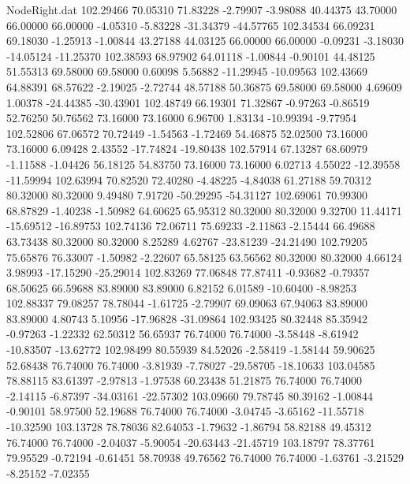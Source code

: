 \begin{filecontents}{NodeRight.dat}
 102.29466   70.05310   71.83228    -2.79907   -3.98088   40.44375   43.70000   66.00000   66.00000   -4.05310   -5.83228  -31.34379  -44.57765
 102.34534   66.09231   69.18030    -1.25913   -1.00844   43.27188   44.03125   66.00000   66.00000   -0.09231   -3.18030  -14.05124  -11.25370
 102.38593   68.97902   64.01118    -1.00844   -0.90101   44.48125   51.55313   69.58000   69.58000    0.60098    5.56882  -11.29945  -10.09563
 102.43669   64.88391   68.57622    -2.19025   -2.72744   48.57188   50.36875   69.58000   69.58000    4.69609    1.00378  -24.44385  -30.43901
 102.48749   66.19301   71.32867    -0.97263   -0.86519   52.76250   50.76562   73.16000   73.16000    6.96700    1.83134  -10.99394   -9.77954
 102.52806   67.06572   70.72449    -1.54563   -1.72469   54.46875   52.02500   73.16000   73.16000    6.09428    2.43552  -17.74824  -19.80438
 102.57914   67.13287   68.60979    -1.11588   -1.04426   56.18125   54.83750   73.16000   73.16000    6.02713    4.55022  -12.39558  -11.59994
 102.63994   70.82520   72.40280    -4.48225   -4.84038   61.27188   59.70312   80.32000   80.32000    9.49480    7.91720  -50.29295  -54.31127
 102.69061   70.99300   68.87829    -1.40238   -1.50982   64.60625   65.95312   80.32000   80.32000    9.32700   11.44171  -15.69512  -16.89753
 102.74136   72.06711   75.69233    -2.11863   -2.15444   66.49688   63.73438   80.32000   80.32000    8.25289    4.62767  -23.81239  -24.21490
 102.79205   75.65876   76.33007    -1.50982   -2.22607   65.58125   63.56562   80.32000   80.32000    4.66124    3.98993  -17.15290  -25.29014
 102.83269   77.06848   77.87411    -0.93682   -0.79357   68.50625   66.59688   83.89000   83.89000    6.82152    6.01589  -10.60400   -8.98253
 102.88337   79.08257   78.78044    -1.61725   -2.79907   69.09063   67.94063   83.89000   83.89000    4.80743    5.10956  -17.96828  -31.09864
 102.93425   80.32448   85.35942    -0.97263   -1.22332   62.50312   56.65937   76.74000   76.74000   -3.58448   -8.61942  -10.83507  -13.62772
 102.98499   80.55939   84.52026    -2.58419   -1.58144   59.90625   52.68438   76.74000   76.74000   -3.81939   -7.78027  -29.58705  -18.10633
 103.04585   78.88115   83.61397    -2.97813   -1.97538   60.23438   51.21875   76.74000   76.74000   -2.14115   -6.87397  -34.03161  -22.57302
 103.09660   79.78745   80.39162    -1.00844   -0.90101   58.97500   52.19688   76.74000   76.74000   -3.04745   -3.65162  -11.55718  -10.32590
 103.13728   78.78036   82.64053    -1.79632   -1.86794   58.82188   49.45312   76.74000   76.74000   -2.04037   -5.90054  -20.63443  -21.45719
 103.18797   78.37761   79.95529    -0.72194   -0.61451   58.70938   49.76562   76.74000   76.74000   -1.63761   -3.21529   -8.25152   -7.02355

\end{filecontents}
